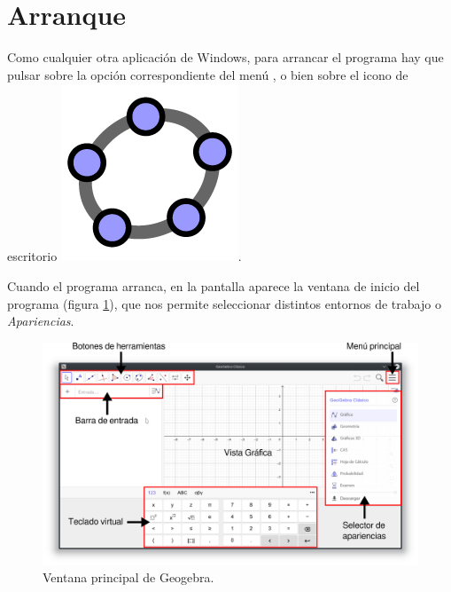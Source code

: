 \section{Arranque}
Como cualquier otra aplicación de Windows, para arrancar el programa hay que pulsar sobre la opción correspondiente del menú , o bien sobre el icono de escritorio \includegraphics[scale=0.04]{img/introduccion/geogebra-icon}.

Cuando el programa arranca, en la pantalla aparece la ventana de inicio del programa (figura \ref{g:ventana-inicio}), que nos permite seleccionar distintos entornos de trabajo o \emph{Apariencias}.

\begin{figure}[h!]
\begin{center}
\includegraphics[width=\textwidth]{img/introduccion/start-window}
\caption{Ventana principal de Geogebra.} \label{g:ventana-inicio}
\end{center}
\end{figure}

